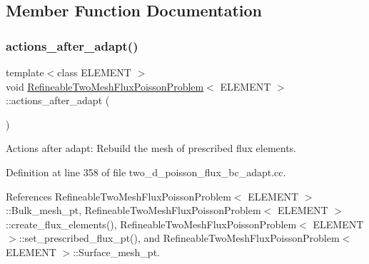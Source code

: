 \subsection{Member Function Documentation}
\mbox{\label{classRefineableTwoMeshFluxPoissonProblem_a0140155529861f5e63ab32feece3c9b6}} 
\subsubsection{\texorpdfstring{actions\+\_\+after\+\_\+adapt()}{actions\_after\_adapt()}}
{\footnotesize\ttfamily template$<$class E\+L\+E\+M\+E\+NT $>$ \\
void \hyperlink{classRefineableTwoMeshFluxPoissonProblem}{Refineable\+Two\+Mesh\+Flux\+Poisson\+Problem}$<$ E\+L\+E\+M\+E\+NT $>$\+::actions\+\_\+after\+\_\+adapt (\begin{DoxyParamCaption}{ }\end{DoxyParamCaption})\hspace{0.3cm}{\ttfamily [private]}}



Actions after adapt\+: Rebuild the mesh of prescribed flux elements. 



Definition at line 358 of file two\+\_\+d\+\_\+poisson\+\_\+flux\+\_\+bc\+\_\+adapt.\+cc.



References Refineable\+Two\+Mesh\+Flux\+Poisson\+Problem$<$ E\+L\+E\+M\+E\+N\+T $>$\+::\+Bulk\+\_\+mesh\+\_\+pt, Refineable\+Two\+Mesh\+Flux\+Poisson\+Problem$<$ E\+L\+E\+M\+E\+N\+T $>$\+::create\+\_\+flux\+\_\+elements(), Refineable\+Two\+Mesh\+Flux\+Poisson\+Problem$<$ E\+L\+E\+M\+E\+N\+T $>$\+::set\+\_\+prescribed\+\_\+flux\+\_\+pt(), and Refineable\+Two\+Mesh\+Flux\+Poisson\+Problem$<$ E\+L\+E\+M\+E\+N\+T $>$\+::\+Surface\+\_\+mesh\+\_\+pt.

\mbox{\label{classRefineableTwoMeshFluxPoissonProblem_ab8b04db3dab6297f609a9a028b1c4473}} 

